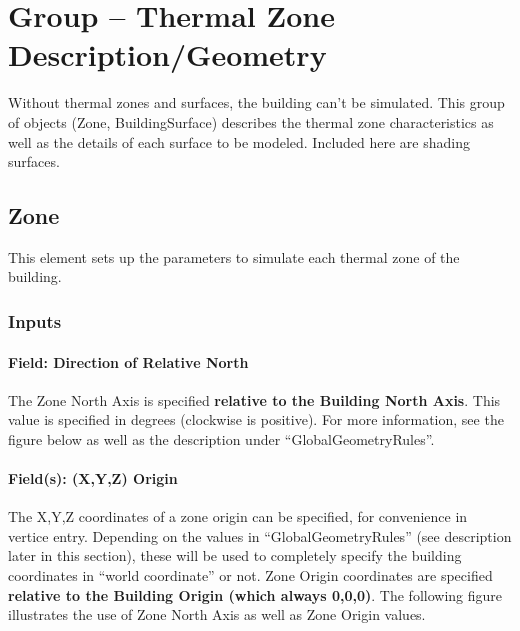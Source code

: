 \section{Group -- Thermal Zone Description/Geometry}\label{group-thermal-zone-descriptiongeometry}

Without thermal zones and surfaces, the building can't be simulated. This group of objects (Zone, BuildingSurface) describes the thermal zone characteristics as well as the details of each surface to be modeled. Included here are shading surfaces.

\subsection{Zone}\label{zone}

This element sets up the parameters to simulate each thermal zone of the building.

\subsubsection{Inputs}\label{inputs-048}

\paragraph{Field: Direction of Relative North}\label{field-direction-of-relative-north}

The Zone North Axis is specified \textbf{relative to the Building North Axis}. This value is specified in degrees (clockwise is positive). For more information, see the figure below as well as the description under ``GlobalGeometryRules''.

\paragraph{Field(s): (X,Y,Z) Origin}\label{fields-xyz-origin}

The X,Y,Z coordinates of a zone origin can be specified, for convenience in vertice entry. Depending on the values in ``GlobalGeometryRules'' (see description later in this section), these will be used to completely specify the building coordinates in ``world coordinate'' or not. Zone Origin coordinates are specified \textbf{relative to the Building Origin (which always 0,0,0)}. The following figure illustrates the use of Zone North Axis as well as Zone Origin values.

